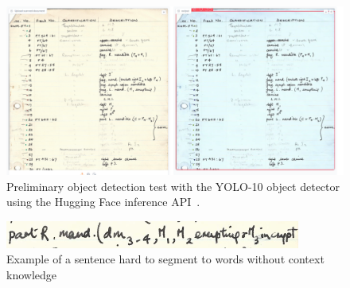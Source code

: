 \documentclass{article}
\begin{document}
\begin{figure}[h]
    \centering
    \includegraphics*[scale=0.3]{../images/yoloresult.png}
    \caption{Preliminary object detection test with the YOLO-10 object detector using the Hugging Face inference API~\cite{OmouredYOLOv10DocumentLayoutAnalysisHugging2023}.}
    \label{image:yolo}
\end{figure}

\begin{figure}[h]
    \centering
    \includegraphics*[scale=0.8]{../images/hardwordsegmentation.png}
    \caption{Example of a sentence hard to segment to words without context knowledge}
    \label{image:hardsentence}
\end{figure}

\printbibliography
\end{document}
